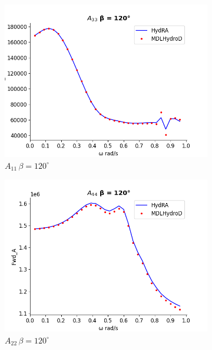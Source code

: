 \begin{figure}[H]
    \vspace{5pt}%
    \begin{subfigure}[b]{0.49\textwidth}
        \includegraphics[width=\textwidth]{plots/kcs/added_mass/a33.png}
        \caption{$A_{11}\, \beta = 120^{\circ}$}
    \end{subfigure}
    \begin{subfigure}[b]{0.49\textwidth}
        \includegraphics[width=\textwidth]{plots/kcs/added_mass/a44.png}
        \caption{$A_{22} \, \beta = 120^{\circ}$}
    \end{subfigure}
    \vspace{5pt}%
    \begin{subfigure}[b]{0.49\textwidth}

\end{subfigure}
\end{figure}
